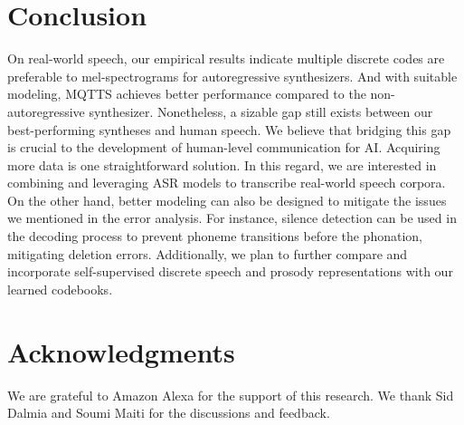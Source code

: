 \documentclass[letterpaper]{article} %
\begin{document}
\section{Conclusion}
\label{sec:conclusion}
On real-world speech, our empirical results indicate multiple discrete codes are preferable to mel-spectrograms for autoregressive synthesizers.
And with suitable modeling, MQTTS achieves better performance compared to the non-autoregressive synthesizer.
Nonetheless, a sizable gap still exists between our best-performing syntheses and human speech.
We believe that bridging this gap is crucial to the development of human-level communication for AI.
Acquiring more data is one straightforward solution.
In this regard, we are interested in combining and leveraging ASR models to transcribe real-world speech corpora.%
On the other hand, better modeling can also be designed to mitigate the issues we mentioned in the error analysis.
For instance, silence detection can be used in the decoding process to prevent phoneme transitions before the phonation, mitigating deletion errors.
Additionally, we plan to further compare and incorporate self-supervised discrete speech and prosody representations with our learned codebooks.

\section*{Acknowledgments}
We are grateful to Amazon Alexa for the support of this research.
We thank Sid Dalmia and Soumi Maiti for the discussions and feedback.


\end{document}
